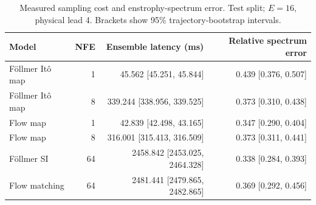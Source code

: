 \begin{table}[t]
\centering
\small
\setlength{\tabcolsep}{3pt}
\caption{Measured sampling cost and enstrophy-spectrum error. Test split; $E=16$, physical lead 4. Brackets show 95\% trajectory-bootstrap intervals.}
\label{tab:map-cost}
\begin{tabular}{lrrr}
\toprule
Model & NFE & Ensemble latency (ms) & Relative spectrum error \\
\midrule
Föllmer Itô map & 1 & 45.562 [45.251, 45.844] & 0.439 [0.376, 0.507] \\
Föllmer Itô map & 8 & 339.244 [338.956, 339.525] & 0.373 [0.310, 0.438] \\
\addlinespace
Flow map & 1 & 42.839 [42.498, 43.165] & 0.347 [0.290, 0.404] \\
Flow map & 8 & 316.001 [315.413, 316.509] & 0.373 [0.311, 0.441] \\
\addlinespace
Föllmer SI & 64 & 2458.842 [2453.025, 2464.328] & 0.338 [0.284, 0.393] \\
\addlinespace
Flow matching & 64 & 2481.441 [2479.865, 2482.865] & 0.369 [0.292, 0.456] \\
\bottomrule
\end{tabular}
\end{table}
